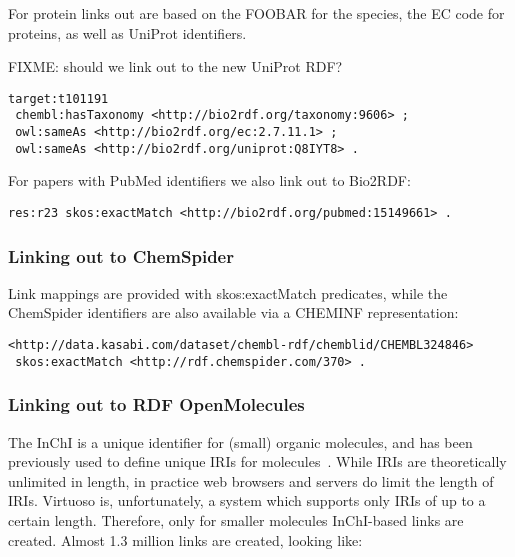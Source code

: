 \documentclass[sw]{iosart2c}
\begin{document}
For protein links out are based on the FOOBAR for the species, the EC code for proteins,
as well as UniProt identifiers.

FIXME: should we link out to the new UniProt RDF?

\begin{tiny}
\begin{verbatim}
target:t101191
 chembl:hasTaxonomy <http://bio2rdf.org/taxonomy:9606> ;
 owl:sameAs <http://bio2rdf.org/ec:2.7.11.1> ;
 owl:sameAs <http://bio2rdf.org/uniprot:Q8IYT8> .
\end{verbatim}
\end{tiny}

For papers with PubMed identifiers we also link out to Bio2RDF:

\begin{tiny}
\begin{verbatim}
res:r23 skos:exactMatch <http://bio2rdf.org/pubmed:15149661> .
\end{verbatim}
\end{tiny}

\subsubsection{Linking out to ChemSpider}

Link mappings are provided with skos:exactMatch predicates, while the ChemSpider identifiers
are also available via a CHEMINF representation:
 
\begin{tiny}
\begin{verbatim}
<http://data.kasabi.com/dataset/chembl-rdf/chemblid/CHEMBL324846>
 skos:exactMatch <http://rdf.chemspider.com/370> .
\end{verbatim}
\end{tiny}

\subsubsection{Linking out to RDF OpenMolecules}

The InChI is a unique identifier for (small) organic molecules, and has been previously used
to define unique IRIs for molecules~\cite{???}. While IRIs are theoretically unlimited in length,
in practice web browsers and servers do limit the length of IRIs. Virtuoso is, unfortunately,
a system which supports only IRIs of up to a certain length. Therefore, only for smaller molecules
InChI-based links are created. Almost 1.3 million links are created, looking like:
\end{document}
